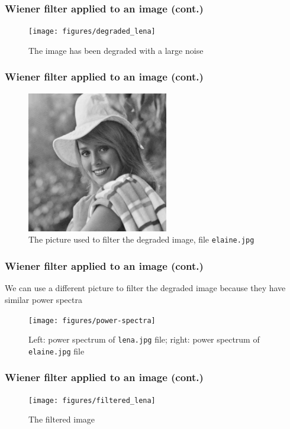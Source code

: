 \documentclass[10pt]{beamer}
\begin{document}
\begin{frame}
  \frametitle{Wiener filter applied to an image (cont.)}
  \begin{figure}
    \centering
    \texttt{[image: figures/degraded\_lena]}
    \caption{The image has been degraded with a large noise}
  \end{figure}
\end{frame}

\begin{frame}
  \frametitle{Wiener filter applied to an image (cont.)}
  \begin{figure}
    \centering
    \includegraphics[width=0.55\textwidth]{elaine}
    \caption{The picture used to filter the degraded image, file
      \texttt{elaine.jpg}}
  \end{figure}
\end{frame}

\begin{frame}
  \frametitle{Wiener filter applied to an image (cont.)}
  We can use a different picture to filter the degraded image because they have
  similar power spectra
  \begin{figure}
    \centering
    \texttt{[image: figures/power-spectra]}
    \caption{Left: power spectrum of \texttt{lena.jpg} file; right: power
      spectrum of \texttt{elaine.jpg} file}
  \end{figure}
\end{frame}

\begin{frame}
  \frametitle{Wiener filter applied to an image (cont.)}
  \begin{figure}
    \centering
    \texttt{[image: figures/filtered\_lena]}
    \caption{The filtered image}
  \end{figure}
\end{frame}

\begin{frame}
  \frametitle{\refname}
  \nocite{*}
  \printbibliography{}
\end{frame}
\end{document}
